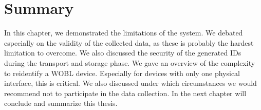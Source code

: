\section{Summary}
In this chapter, we demonstrated the limitations of the system. We debated especially on the validity of the collected data, as these is probably the hardest limitation to overcome.
We also discussed the security of the generated IDs during the transport and storage phase. We gave an overview of the complexity to reidentify a WOBL device. Especially for devices with only one physical interface, this is critical. We also discussed under which circumstances we would recommend not to participate in the data collection.
In the next chapter will conclude and summarize this thesis.

